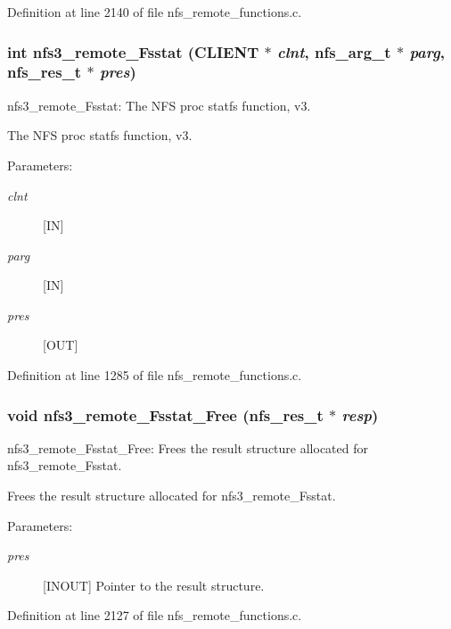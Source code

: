 Definition at line 2140 of file nfs\_\-remote\_\-functions.c.
\subsubsection{\setlength{\rightskip}{0pt plus 5cm}int nfs3\_\-remote\_\-Fsstat (CLIENT $\ast$ {\em clnt}, nfs\_\-arg\_\-t $\ast$ {\em parg}, nfs\_\-res\_\-t $\ast$ {\em pres})}\label{group__NFSprocs_ga33}


nfs3\_\-remote\_\-Fsstat: The NFS proc statfs function, v3.

The NFS proc statfs function, v3.

\begin{Desc}
\item[Parameters:]
\begin{description}
\item[{\em clnt}][IN] \item[{\em parg}][IN] \item[{\em pres}][OUT] \end{description}
\end{Desc}


Definition at line 1285 of file nfs\_\-remote\_\-functions.c.
\subsubsection{\setlength{\rightskip}{0pt plus 5cm}void nfs3\_\-remote\_\-Fsstat\_\-Free (nfs\_\-res\_\-t $\ast$ {\em resp})}\label{group__NFSprocs_ga89}


nfs3\_\-remote\_\-Fsstat\_\-Free: Frees the result structure allocated for nfs3\_\-remote\_\-Fsstat.

Frees the result structure allocated for nfs3\_\-remote\_\-Fsstat.

\begin{Desc}
\item[Parameters:]
\begin{description}
\item[{\em pres}][INOUT] Pointer to the result structure. \end{description}
\end{Desc}


Definition at line 2127 of file nfs\_\-remote\_\-functions.c.
